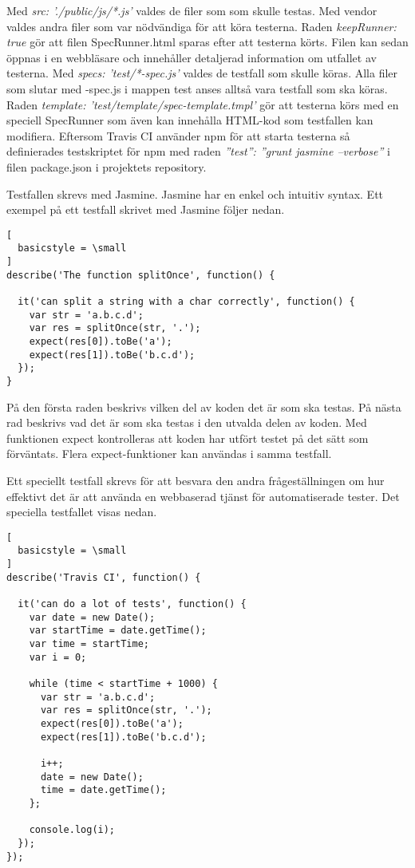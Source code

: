 Med \emph{src: './public/js/*.js'} valdes de filer som som skulle testas.
Med vendor valdes andra filer som var nödvändiga för att köra testerna.
Raden \emph{keepRunner: true} gör att filen \textunderscore SpecRunner.html sparas efter att
testerna körts. Filen kan sedan öppnas i en webbläsare och innehåller
detaljerad information om utfallet av testerna.
Med \emph{specs: 'test/*-spec.js'} valdes de testfall som skulle köras.
Alla filer som slutar med -spec.js i mappen test anses alltså vara
testfall som ska köras.
Raden \emph{template: 'test/template/spec-template.tmpl'} gör att testerna
körs med en speciell SpecRunner som även kan innehålla HTML-kod som testfallen
kan modifiera.
Eftersom Travis CI använder npm för att starta 
testerna så definierades testskriptet för npm med raden
\emph{''test'': ''grunt jasmine --verbose''} i filen package.json 
i projektets repository.

Testfallen skrevs med Jasmine. Jasmine har en enkel och intuitiv syntax.
Ett exempel på ett testfall skrivet med Jasmine följer nedan.

\begin{lstlisting}[
  basicstyle = \small
]
describe('The function splitOnce', function() {
	
  it('can split a string with a char correctly', function() {
    var str = 'a.b.c.d';
    var res = splitOnce(str, '.');
    expect(res[0]).toBe('a');
    expect(res[1]).toBe('b.c.d');
  });
}
\end{lstlisting}

På den första raden beskrivs vilken del av koden det är som ska testas.
På nästa rad beskrivs vad det är som ska testas i den utvalda delen av koden.
Med funktionen expect kontrolleras att koden har utfört testet på det sätt
som förväntats. Flera expect-funktioner kan användas i samma testfall.

Ett speciellt testfall skrevs
för att besvara den andra frågeställningen om hur effektivt det är 
att använda en webbaserad tjänst
för automatiserade tester. Det speciella testfallet visas nedan.

\begin{lstlisting}[
  basicstyle = \small
]
describe('Travis CI', function() {
	
  it('can do a lot of tests', function() {
    var date = new Date();
    var startTime = date.getTime();
    var time = startTime;
    var i = 0;

    while (time < startTime + 1000) {  
      var str = 'a.b.c.d';
      var res = splitOnce(str, '.');
      expect(res[0]).toBe('a');
      expect(res[1]).toBe('b.c.d');

      i++;
      date = new Date(); 
      time = date.getTime();
    };

    console.log(i);
  });
});
\end{lstlisting}


